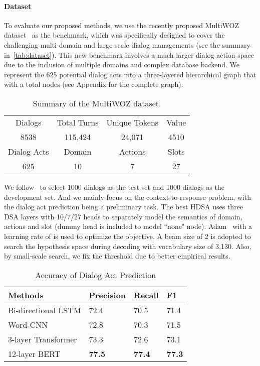 \documentclass[11pt,a4paper]{article}
\begin{document}
\paragraph{Dataset} 
To evaluate our proposed methods, we use the recently proposed MultiWOZ dataset~\cite{DBLP:conf/emnlp/BudzianowskiWTC18} as the benchmark, which was specifically designed to cover the challenging multi-domain and large-scale dialog managements (see the summary in~\autoref{tab:dataset}). This new benchmark involves a much larger dialog action space due to the inclusion of multiple domains and complex database backend. We represent the 625 potential dialog acts into a three-layered hierarchical graph that with a total  nodes (see Appendix for the complete graph).
\begin{table}[htb]
\small
\centering
\begin{tabular}{cccc} 
\toprule
Dialogs & Total Turns   & Unique Tokens  & Value  \\
8538     & 115,424  & 24,071  &  4510     \\ 
\midrule
Dialog Acts  & Domain & Actions & Slots   \\ 
625     & 10        & 7          & 27      \\
\bottomrule
\end{tabular}
\caption{Summary of the MultiWOZ dataset.}
\label{tab:dataset}
\end{table}
We follow~\citet{DBLP:conf/emnlp/BudzianowskiWTC18} to select 1000 dialogs as the test set and 1000 dialogs as the development set. And we mainly focus on the context-to-response problem, with the dialog act prediction being a preliminary task. The best HDSA uses three DSA layers with 10/7/27 heads to separately model the semantics of domain, actions and slot (dummy head is included to model ``none" node). Adam~\cite{kingma2014adam} with a learning rate of  is used to optimize the objective. A beam size of 2 is adopted to search the hypothesis space during decoding with vocabulary size of 3,130. Also, by small-scale search, we fix the threshold  due to better empirical results.
\begin{table}[htb]
\centering
\small
\begin{tabular}{llll} 
\toprule
Methods            & Precision & Recall & F1  \\ 
\midrule  
Bi-directional LSTM               &     72.4   &70.5     &  71.4 \\
Word-CNN        &       72.8    & 70.3      & 71.5    \\
3-layer Transformer &   73.3        &   72.6     &  73.1   \\
12-layer BERT &     \textbf{77.5}      &    \textbf{77.4}    &    \textbf{77.3} \\
\bottomrule
\end{tabular}
\caption{Accuracy of Dialog Act Prediction}
\label{tab:predict}
\end{table}
\end{document}
